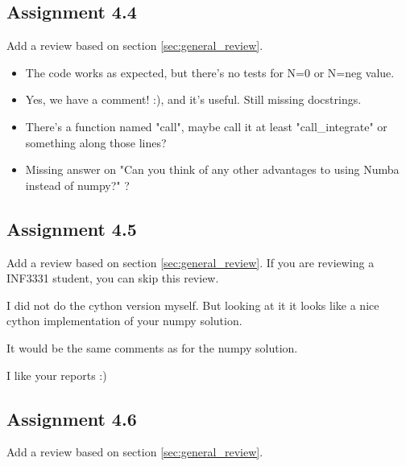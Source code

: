 \documentclass[a4paper]{article}
\begin{document}
\subsection*{Assignment 4.4}
Add a review based on section \ref{sec:general_review}.


\begin{itemize}
\item The code works as expected, but there's no tests for N=0 or N=neg value.

\item Yes, we have a comment! :), and it's useful. Still missing docstrings.

\item There's a function named "call", maybe call it at least "call\_integrate" or something along those lines?
 
\item  Missing answer on "Can you think of any other advantages to using Numba
instead of numpy?" ?
\end{itemize}


\subsection*{Assignment 4.5}
Add a review based on section \ref{sec:general_review}. If you are reviewing a INF3331 student, you can skip this review.



I did not do the cython version myself.
But looking at it it looks like a nice cython implementation of your numpy solution.

It would be the same comments as for the numpy solution.

I like your reports :)

\subsection*{Assignment 4.6}
Add a review based on section \ref{sec:general_review}.
\end{document}
